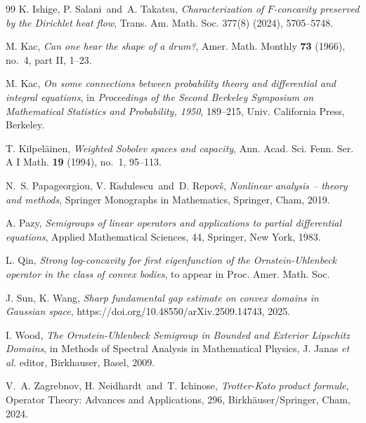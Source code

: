 \documentclass[12pt]{amsart}
\newcommand{\1}{\mathbf 1}
\begin{document}
\begin{thebibliography}{99}
 K. Ishige, P. Salani\ and\ A. Takatsu,  {\em Characterization of $F$-concavity preserved by the Dirichlet heat flow}, Trans. Am. Math. Soc. 377(8) (2024), 5705--5748.

M. Kac, {\em Can one hear the shape of a drum?}, Amer. Math. Monthly {\bf 73} (1966), no.~4, part II, 1--23.

M. Kac, {\em On some connections between probability theory and differential and integral equations}, in {\it Proceedings of the Second Berkeley Symposium on Mathematical Statistics and Probability, 1950}, 189--215, Univ. California Press, Berkeley.


 T. Kilpel\"{a}inen, {\em Weighted Sobolev spaces and capacity}, Ann. Acad. Sci. Fenn. Ser. A I Math. {\bf 19} (1994), no.~1, 95--113.




N.~S. Papageorgiou, V. R$\mathrm{\check{a}}$dulescu\ and\ D. Repov\v{s}, {\em Nonlinear analysis -- theory and methods}, Springer Monographs in Mathematics, Springer, Cham, 2019.

A. Pazy, {\it Semigroups of linear operators and applications to partial differential equations}, Applied Mathematical Sciences, 44, Springer, New York, 1983.

L. Qin, {\it Strong log-concavity for first eigenfunction of the Ornstein-Uhlenbeck operator in the class of convex bodies}, to appear in Proc. Amer. Math. Soc.

J. Sun, K. Wang, {\it Sharp fundamental gap estimate on convex domains in Gaussian space}, https://doi.org/10.48550/arXiv.2509.14743, 2025.


I. Wood, {\it The Ornstein-Uhlenbeck Semigroup in Bounded and Exterior Lipschitz Domains}, in Methods of
Spectral Analysis in Mathematical Physics, J. Janas {\it et al.} editor, Birkhauser, Basel, 2009.

V.~A. Zagrebnov, H. Neidhardt\ and\ T. Ichinose, {\em Trotter-Kato product formule}, Operator Theory: Advances and Applications, 296, Birkh\"{a}user/Springer, Cham, 2024.

\end{thebibliography}
\end{document}
